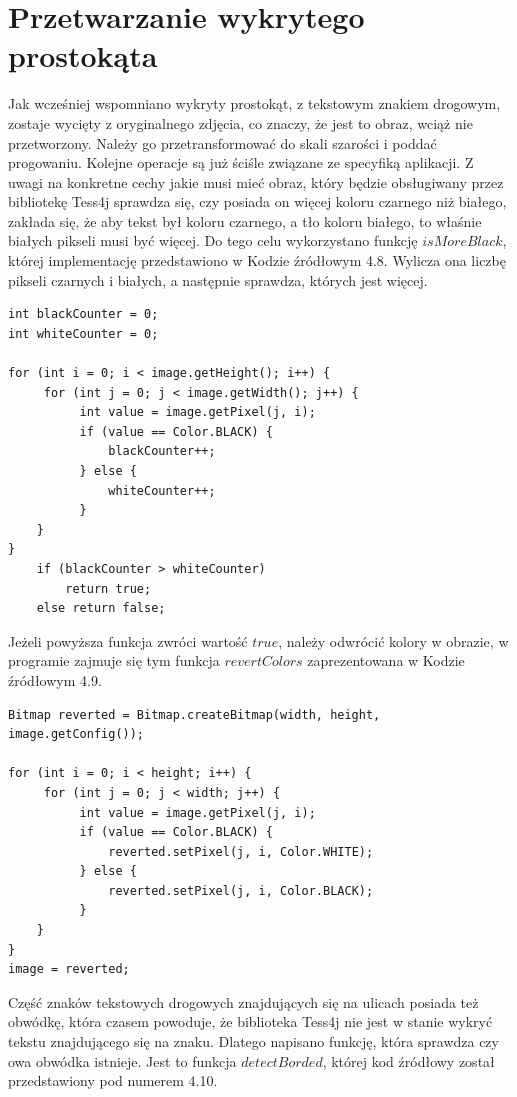 \documentclass[eng,oneside]{mgr}
\begin{document}
\section{Przetwarzanie wykrytego prostokąta}
Jak wcześniej wspomniano wykryty prostokąt, z tekstowym znakiem drogowym, zostaje wycięty z oryginalnego zdjęcia, co znaczy, że jest to obraz, wciąż nie przetworzony. Należy go przetransformować do skali szarości i poddać progowaniu. Kolejne operacje są już ściśle związane ze specyfiką aplikacji. Z uwagi na konkretne cechy jakie musi mieć obraz, który będzie obsługiwany przez bibliotekę Tess4j sprawdza się, czy posiada on więcej koloru czarnego niż białego, zakłada się, że aby tekst był koloru czarnego, a tło koloru białego, to właśnie białych pikseli musi być więcej. Do tego celu wykorzystano funkcję $isMoreBlack$, której implementację przedstawiono w Kodzie źródłowym 4.8. Wylicza ona liczbę pikseli czarnych i białych, a następnie sprawdza, których jest więcej.
\begin{lstlisting}[caption={Kod programu, odpowiadający za sprawdzenie czy jest więcej czarnych pikseli}]
int blackCounter = 0;
int whiteCounter = 0;

for (int i = 0; i < image.getHeight(); i++) {
     for (int j = 0; j < image.getWidth(); j++) {
          int value = image.getPixel(j, i);
          if (value == Color.BLACK) {
              blackCounter++;
          } else {
              whiteCounter++;
          }
    }
}
    if (blackCounter > whiteCounter)
        return true;
    else return false;
\end{lstlisting}
\par Jeżeli powyższa funkcja zwróci wartość $true$, należy odwrócić kolory w obrazie, w programie zajmuje się tym funkcja $revertColors$ zaprezentowana w Kodzie źródłowym 4.9.
\begin{lstlisting}[caption={Kod programu, odpowiadający za odwrócenie kolorów w obrazie}]
Bitmap reverted = Bitmap.createBitmap(width, height, image.getConfig());

for (int i = 0; i < height; i++) {
     for (int j = 0; j < width; j++) {
          int value = image.getPixel(j, i);
          if (value == Color.BLACK) {
              reverted.setPixel(j, i, Color.WHITE);
          } else {
              reverted.setPixel(j, i, Color.BLACK);
          }
    }
}
image = reverted;
\end{lstlisting}
\par Część znaków tekstowych drogowych znajdujących się na ulicach posiada też obwódkę, która czasem powoduje, że biblioteka Tess4j nie jest w stanie wykryć tekstu znajdującego się na znaku. Dlatego napisano funkcję, która sprawdza czy owa obwódka istnieje. Jest to funkcja $detectBorded$, której kod źródłowy został przedstawiony pod numerem 4.10.
\end{document}
